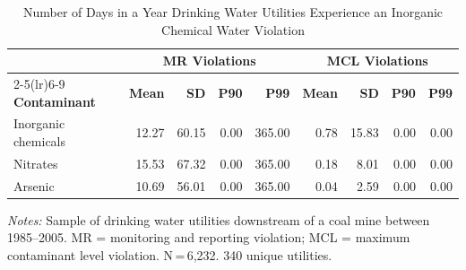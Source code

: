\begin{table}[htbp]
\centering
\caption{Number of Days in a Year Drinking Water Utilities Experience an Inorganic Chemical Water Violation}
\label{tab:ioc_days_dwnstrm}
\small
\begin{tabular}{lrrrrrrrr}
\hline\hline
 & \multicolumn{4}{c}{\textbf{MR Violations}} & \multicolumn{4}{c}{\textbf{MCL Violations}} \\
\cmidrule(lr){2-5}\cmidrule(lr){6-9}
\textbf{Contaminant} & \textbf{Mean} & \textbf{SD} & \textbf{P90} & \textbf{P99} & \textbf{Mean} & \textbf{SD} & \textbf{P90} & \textbf{P99} \\
\hline
Inorganic chemicals & 12.27 & 60.15 & 0.00 & 365.00 & 0.78 & 15.83 & 0.00 & 0.00 \\
Nitrates & 15.53 & 67.32 & 0.00 & 365.00 & 0.18 & 8.01 & 0.00 & 0.00 \\
Arsenic & 10.69 & 56.01 & 0.00 & 365.00 & 0.04 & 2.59 & 0.00 & 0.00 \\
\hline\hline
\end{tabular}
\begin{minipage}{\linewidth}
\vspace{4pt}
\footnotesize
\raggedright
\textit{Notes:} Sample of drinking water utilities downstream of a coal mine between 1985--2005. MR = monitoring and reporting violation; MCL = maximum contaminant level violation. N\,=\,6,232. 340 unique utilities.
\end{minipage}
\end{table}
